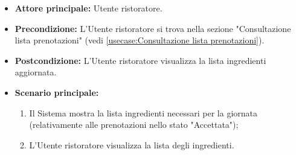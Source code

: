 \label{usecase:Consultazione lista ingredienti}
\begin{itemize}

	\item \textbf{Attore principale:} Utente ristoratore.

	\item \textbf{Precondizione:} L'Utente ristoratore si trova nella sezione "Consultazione lista prenotazioni" (vedi \autoref{usecase:Consultazione lista prenotazioni}).

	\item \textbf{Postcondizione:} L'Utente ristoratore visualizza la lista ingredienti aggiornata.

	\item \textbf{Scenario principale:}
	\begin{enumerate}
		\item Il Sistema mostra la lista ingredienti necessari per la giornata (relativamente alle prenotazioni nello stato "Accettata");
		\item L'Utente ristoratore visualizza la lista degli ingredienti.
	\end{enumerate}

\end{itemize}

